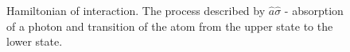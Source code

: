 \begin{figure}
\centering



\caption{Hamiltonian of interaction. The process described by $\hat{a}\hat{\sigma}$ - absorption
  of a photon and transition of the atom from the upper state to the lower state.}
\label{figPart1Ch2_2_1}
\end{figure}